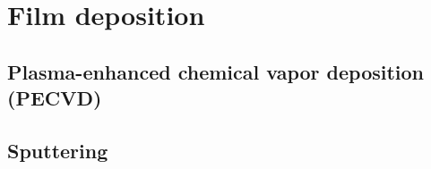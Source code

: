 %
\chapter{Film deposition}
\label{sec:related}


\Blindtext[2][1]

\section{Plasma-enhanced chemical vapor deposition (PECVD)}
\Blindtext[2][2]
\section{Sputtering}
\label{sec:related:sec2}
\Blindtext[3][2]
